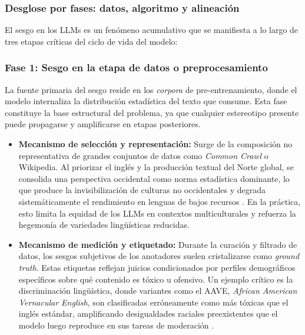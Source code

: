 \documentclass[12pt,a4paper]{report}
\begin{document}
\subsubsection{Desglose por fases: datos, algoritmo y alineación}
\label{subsec:jerarquia_sesgo}

El sesgo en los LLMs es un fenómeno acumulativo que se manifiesta a lo largo de tres etapas críticas del ciclo de vida del modelo:

\subsubsection*{Fase 1: Sesgo en la etapa de datos o preprocesamiento}
La fuente primaria del sesgo reside en los \textit{corpora} de pre-entrenamiento, donde el modelo internaliza la distribución estadística del texto que consume. Esta fase constituye la base estructural del problema, ya que cualquier estereotipo presente puede propagarse y amplificarse en etapas posteriores.

\begin{itemize}
    \item \textbf{Mecanismo de selección y representación:} Surge de la composición no representativa de grandes conjuntos de datos como \textit{Common Crawl} o Wikipedia. Al priorizar el inglés y la producción textual del Norte global, se consolida una perspectiva occidental como norma estadística dominante, lo que produce la invisibilización de culturas no occidentales y degrada sistemáticamente el rendimiento en lenguas de bajos recursos \cite{yogarajan_tackling_2023, lin_towards_2024}. En la práctica, esto limita la equidad de los LLMs en contextos multiculturales y refuerza la hegemonía de variedades lingüísticas reducidas.
    
    \item \textbf{Mecanismo de medición y etiquetado:} Durante la curación y filtrado de datos, los sesgos subjetivos de los anotadores suelen cristalizarse como \textit{ground truth}. Estas etiquetas reflejan juicios condicionados por perfiles demográficos específicos sobre qué contenido es tóxico u ofensivo. Un ejemplo crítico es la discriminación lingüística, donde variantes como el AAVE, \textit{African American Vernacular English}, son clasificadas erróneamente como más tóxicas que el inglés estándar, amplificando desigualdades raciales preexistentes que el modelo luego reproduce en sus tareas de moderación \cite{shah_comprehensive_2025, guo_bias_2024}.
\end{itemize}
\end{document}
